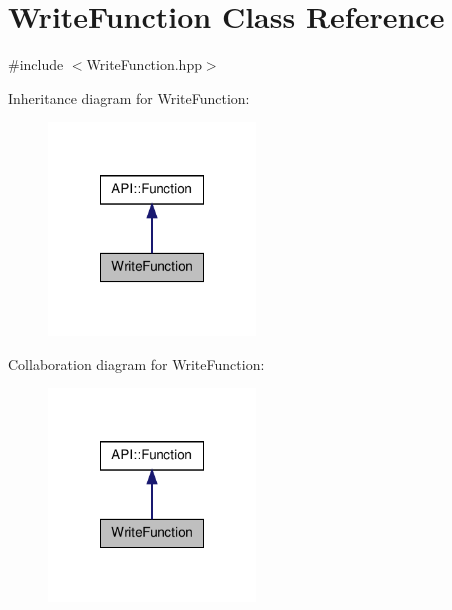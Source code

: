 \hypertarget{class_write_function}{\section{Write\-Function Class Reference}
\label{class_write_function}
}


{\ttfamily \#include $<$Write\-Function.\-hpp$>$}



Inheritance diagram for Write\-Function\-:\nopagebreak
\begin{figure}[H]
\begin{center}
\leavevmode
\includegraphics[width=156pt]{class_write_function__inherit__graph}
\end{center}
\end{figure}


Collaboration diagram for Write\-Function\-:\nopagebreak
\begin{figure}[H]
\begin{center}
\leavevmode
\includegraphics[width=156pt]{class_write_function__coll__graph}
\end{center}
\end{figure}
